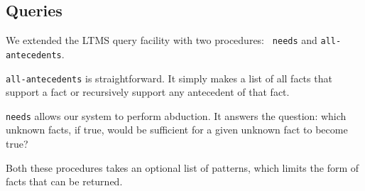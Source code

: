 \subsection{Queries}

We extended the LTMS query facility with two procedures: {\small\tt
needs} and {\small\tt all-antecedents}. 

{\small\tt all-antecedents} is straightforward. It simply makes a list
of all facts that support a fact or recursively support any antecedent
of that fact.

{\small\tt needs} allows our system to perform abduction. It answers
the question: which unknown facts, if true, would be sufficient for a
given unknown fact to become true?

Both these procedures takes an optional list of patterns, which limits
the form of facts that can be returned.
